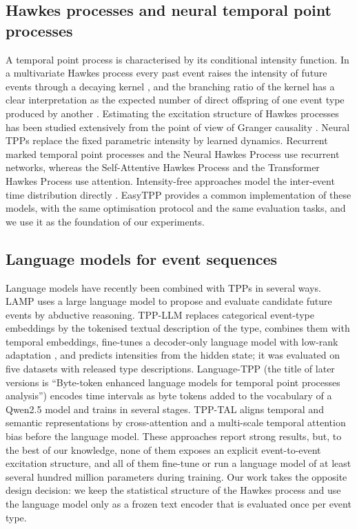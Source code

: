 \documentclass[preprint,12pt,authoryear]{elsarticle}
\begin{document}
\subsection{Hawkes processes and neural temporal point processes}

A temporal point process is characterised by its conditional intensity function. In a multivariate Hawkes process every past event raises the intensity of future events through a decaying kernel \citep{hawkes1971spectra}, and the branching ratio of the kernel has a clear interpretation as the expected number of direct offspring of one event type produced by another \citep{laub2015hawkes}. Estimating the excitation structure of Hawkes processes has been studied extensively from the point of view of Granger causality \citep{xu2016learning}. Neural TPPs replace the fixed parametric intensity by learned dynamics. Recurrent marked temporal point processes \citep{du2016recurrent} and the Neural Hawkes Process \citep{mei2017neural} use recurrent networks, whereas the Self-Attentive Hawkes Process \citep{zhang2020self} and the Transformer Hawkes Process \citep{zuo2020transformer} use attention. Intensity-free approaches model the inter-event time distribution directly \citep{shchur2020intensity}. EasyTPP \citep{xue2024easytpp} provides a common implementation of these models, with the same optimisation protocol and the same evaluation tasks, and we use it as the foundation of our experiments.

\subsection{Language models for event sequences}

Language models have recently been combined with TPPs in several ways. LAMP \citep{shi2023lamp} uses a large language model to propose and evaluate candidate future events by abductive reasoning. TPP-LLM \citep{liu2024tppllm} replaces categorical event-type embeddings by the tokenised textual description of the type, combines them with temporal embeddings, fine-tunes a decoder-only language model with low-rank adaptation \citep{hu2022lora}, and predicts intensities from the hidden state; it was evaluated on five datasets with released type descriptions. Language-TPP \citep{kong2025bytetoken} (the title of later versions is ``Byte-token enhanced language models for temporal point processes analysis'') encodes time intervals as byte tokens added to the vocabulary of a Qwen2.5 model and trains in several stages. TPP-TAL \citep{chen2025tal} aligns temporal and semantic representations by cross-attention and a multi-scale temporal attention bias before the language model. These approaches report strong results, but, to the best of our knowledge, none of them exposes an explicit event-to-event excitation structure, and all of them fine-tune or run a language model of at least several hundred million parameters during training. Our work takes the opposite design decision: we keep the statistical structure of the Hawkes process and use the language model only as a frozen text encoder that is evaluated once per event type.
\end{document}
